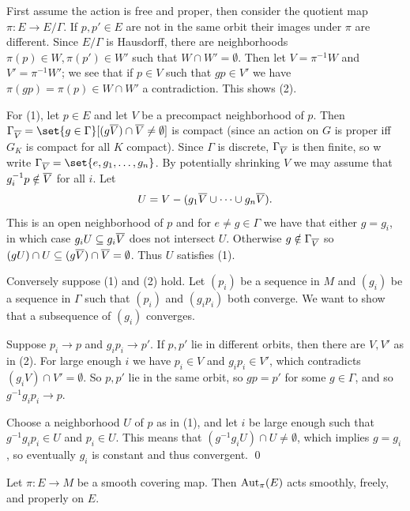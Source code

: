 \bproof

    First assume the action is free and proper, then consider the quotient map $\pi\colon E\to E/\Gamma$.
    If $p,p'\in E$ are not in the same orbit their images under $\pi$ are different.
    Since $E/\Gamma$ is Hausdorff, there are neighborhoods $\pi(p)\in W,\pi(p')\in W'$ such that $W\cap W'=\emptyset$.
    Then let $V=\pi^{-1}W$ and $V'=\pi^{-1}W'$; we see that if $p\in V$ such that $gp\in V'$ we have $\pi(gp)=\pi(p)\in W\cap W'$ a contradiction.
    This shows (2).

    For (1), let $p\in E$ and let $V$ be a precompact neighborhood of $p$.
    Then $\Gamma_{\cl V}=\set{g\in\Gamma}[(g\cl V)\cap\cl V\neq\emptyset]$ is compact (since an action on $G$ is proper iff $G_K$ is compact for all $K$ compact).
    Since $\Gamma$ is discrete, $\Gamma_{\overline V}$ is then finite, so w write $\Gamma_{\cl V}=\set{e,g_1,\dots,g_n}$.
    By potentially shrinking $V$ we may assume that $g_i^{-1}p\notin\overline V$ for all $i$.
    Let
    $$ U = V - (g_1\overline V\cup\cdots\cup g_n\overline V ) . $$
    This is an open neighborhood of $p$ and for $e\neq g\in\Gamma$ we have that either $g=g_i$, in which case $g_iU\subseteq g_i\overline V$ does not intersect $U$.
    Otherwise $g\notin\Gamma_{\overline V}$ so $(gU)\cap U\subseteq(g\overline V)\cap\overline V=\emptyset$.
    Thus $U$ satisfies (1).

    Conversely suppose (1) and (2) hold.
    Let $(p_i)$ be a sequence in $M$ and $(g_i)$ be a sequence in $\Gamma$ such that $(p_i)$ and $(g_ip_i)$ both converge.
    We want to show that a subsequence of $(g_i)$ converges.

    Suppose $p_i\to p$ and $g_ip_i\to p'$.
    If $p,p'$ lie in different orbits, then there are $V,V'$ as in (2).
    For large enough $i$ we have $p_i\in V$ and $g_ip_i\in V'$, which contradicts $(g_iV)\cap V'=\emptyset$.
    So $p,p'$ lie in the same orbit, so $gp=p'$ for some $g\in\Gamma$, and so $g^{-1}g_ip_i\to p$.

    Choose a neighborhood $U$ of $p$ as in (1), and let $i$ be large enough such that $g^{-1}g_ip_i\in U$ and $p_i\in U$.
    This means that $(g^{-1}g_iU)\cap U\neq\emptyset$, which implies $g=g_i$, so eventually $g_i$ is constant and thus convergent.
    \qed

\eproof

\bprop

    Let $\pi\colon E\to M$ be a smooth covering map.
    Then ${\rm Aut}_\pi(E)$ acts smoothly, freely, and properly on $E$.

\eprop

